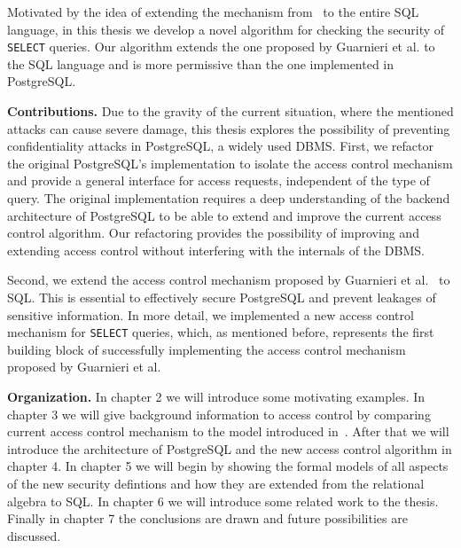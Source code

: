 Motivated by the idea of extending the mechanism from~\cite{guarnieri2016strong} to the entire SQL language, in this thesis we develop a novel algorithm for checking the security of \texttt{SELECT} queries.
%
Our algorithm extends the one proposed by Guarnieri et al. to the SQL language and is more permissive than the one implemented in PostgreSQL.

\smallskip
\noindent
{\bf Contributions.}
%
Due to the gravity of the current situation, where the mentioned attacks can cause severe damage, this thesis explores the possibility of preventing confidentiality attacks in PostgreSQL, a widely used DBMS.
%
First, we refactor the original PostgreSQL's implementation to isolate the access control mechanism and provide a general interface for access requests, independent of the type of query.
%
The original implementation requires a deep understanding of the backend architecture of PostgreSQL to be able to extend and improve the current access control algorithm.
%
Our refactoring provides the possibility of improving and extending access control without interfering with the internals of the DBMS.

Second, we extend the access control mechanism proposed by Guarnieri et al.~\cite{guarnieri2016strong} to SQL.
%
This is essential to effectively secure PostgreSQL and prevent leakages of sensitive information.
%
In more detail, we implemented a new access control mechanism for \texttt{SELECT} queries, which, as mentioned before, represents the first building block of successfully implementing the access control mechanism proposed by Guarnieri et al.

\smallskip
\noindent
{\bf Organization.}
%
In chapter 2 we will introduce some motivating examples.
%
In chapter 3 we will give background information to access control by comparing current access control mechanism to the model introduced in~\cite{guarnieri2016strong}.
%
After that we will introduce the architecture of PostgreSQL and the new access control algorithm in chapter 4. 
%
In chapter 5 we will begin by showing the formal models of all aspects of the new security defintions and how they are extended from the relational algebra to SQL.  
%
In chapter 6 we will introduce some related work to the thesis. 
%
Finally in chapter 7 the conclusions are drawn and future possibilities are discussed.